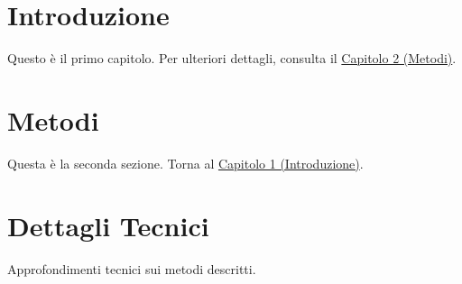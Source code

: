 \documentclass{book}
\begin{document}
\tableofcontents

\chapter{Introduzione}
\label{ch:intro}
Questo è il primo capitolo. Per ulteriori dettagli, consulta il \hyperref[ch:metodi]{Capitolo 2 (Metodi)}.

\chapter{Metodi}
\label{ch:metodi}
Questa è la seconda sezione. Torna al \hyperref[ch:intro]{Capitolo 1 (Introduzione)}.

\appendix
\chapter{Dettagli Tecnici}
\label{appendix:detagli}
Approfondimenti tecnici sui metodi descritti.
\end{document}
